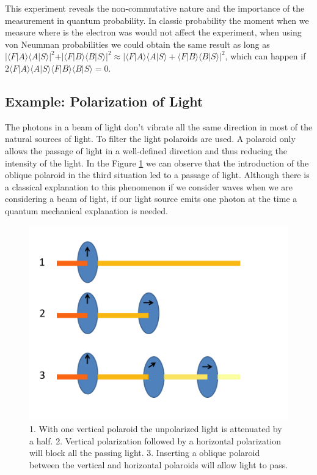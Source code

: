 This experiment reveals the non-commutative nature and the importance of the measurement in quantum probability\cite{Leifer2008}\cite{Busemeyer}. In classic probability the moment when we measure where is the electron was would not affect the experiment, when using von Neumman probabilities we could obtain the same result as long as $\vert \langle F \vert A\rangle \langle A \vert S\rangle \vert^{2}
+
\vert \langle F \vert B\rangle \langle B \vert S\rangle \vert^{2} \approx \vert \langle F \vert A\rangle \langle A \vert S\rangle 
+
 \langle F \vert B\rangle \langle B \vert S\rangle \vert^{2}$, which can happen if $2\langle F \vert A\rangle \langle A \vert S\rangle \langle F \vert B\rangle \langle B \vert S\rangle = 0$. 

\subsection{Example: Polarization of Light}
The photons in a beam of light don't vibrate all the same direction in most of the natural sources of light. To filter the light polaroids are used. A polaroid only allows the passage of light in a well-defined direction and thus reducing the intensity of the light. In the Figure \ref{fig:polaroids} we can observe that the introduction of the oblique polaroid in the third situation led to a passage of light. Although there is a classical explanation to this phenomenon if we consider waves when we are considering a beam of light, if our light source emits one photon at the time a quantum mechanical explanation is needed\cite{Rieffel2011}.

\begin{figure}[h]
\centering 

\includegraphics[scale=0.25]{Figures/Polaroids.png}
\caption{1. With one vertical polaroid the unpolarized light is attenuated by a half. 2. Vertical polarization followed by a horizontal polarization will block all the passing light. 3. Inserting a oblique polaroid between the vertical and horizontal polaroids will allow light to pass.}
\label{fig:polaroids}
\end{figure}

